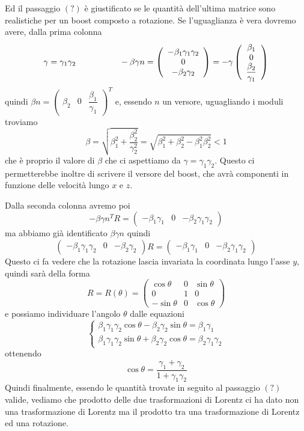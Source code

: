 \documentclass[12pt,a4paper,titlepage, twoside, openright]{book}
\numberwithin{equation}{chapter}
\begin{document}
Ed il passaggio $(?)$ è giustificato se le quantità dell'ultima matrice sono realistiche per un boost composto a rotazione. 
Se l'uguaglianza è vera dovremo avere, dalla prima colonna
\[
\gamma=\gamma_1\gamma_2 \hspace{0.15\linewidth} -\beta\gamma n = \left(\begin{array}{c} -\beta_1\gamma_1\gamma_2 \\ 0 \\ -\beta_2\gamma_2 \end{array}\right)=-\gamma\left(\begin{array}{c} \beta_1 \\ 0 \\ \dfrac{\beta_2}{\gamma_1} \end{array}\right)
\]
quindi $\beta n = \left(\begin{array}{ccc}
\beta_2 & 0 & \dfrac{\beta_1}{\gamma_1}
\end{array}\right)^T$ e, essendo $n$ un versore, uguagliando i moduli troviamo
\[
\beta=\sqrt{\beta_1^2+\dfrac{\beta_2^2}{\gamma_2^2}}=\sqrt{\beta_1^2+\beta_2^2-\beta_1^2\beta_2^2}<1
\]
che è proprio il valore di $\beta$ che ci aspettiamo da $\gamma=\gamma_1\gamma_2$.
Questo ci permetterebbe inoltre di scrivere il versore del boost, che avrà componenti in funzione delle velocità lungo $x$ e $z$.

Dalla seconda colonna avremo poi
\[
-\beta\gamma n^T R= \left(\begin{array}{ccc} -\beta_1\gamma_1 & 0 & -\beta_2\gamma_1\gamma_2 \end{array}\right) 
\]
ma abbiamo già identificato $\beta\gamma n$ quindi 
\[
\left(\begin{array}{ccc}
-\beta_1\gamma_1\gamma_2 & 0 &-\beta_2\gamma_2 \end{array}\right)R=\left(\begin{array}{ccc} -\beta_1\gamma_1 & 0 & -\beta_2\gamma_1\gamma_2 \end{array}\right) 
\]
Questo ci fa vedere che la rotazione lascia invariata la coordinata lungo l'asse $y$, quindi sarà della forma
\[ R=R(\theta)=
\left(\begin{array}{ccc}
\cos{\theta} & 0 & \sin{\theta} \\
0 & 1 & 0 \\
-\sin{\theta} & 0 & \cos{\theta} 
\end{array}\right)
\]
e possiamo individuare l'angolo $\theta$ dalle equazioni
\[
\begin{cases}
\beta_1\gamma_1\gamma_2\cos{\theta}-\beta_2\gamma_2\sin{\theta}=\beta_1\gamma_1 \\
\beta_1\gamma_1\gamma_2\sin{\theta}+\beta_2\gamma_2\cos{\theta}=\beta_2\gamma_1\gamma_2
\end{cases}
\]
ottenendo
\[
\cos{\theta}=\dfrac{\gamma_1+\gamma_2}{1+\gamma_1\gamma_2}
\]
Quindi finalmente, essendo le quantità trovate in seguito al passaggio $(?)$ valide, vediamo che prodotto delle due trasformazioni di Lorentz ci ha dato non una trasformazione di Lorentz ma il prodotto tra una trasformazione di Lorentz ed una rotazione.
\end{document}

